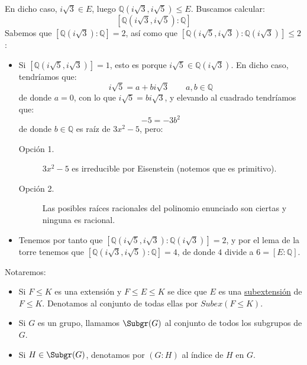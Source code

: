 \begin{ejemplo}
    \noindent
    En dicho caso, $i\sqrt{3}\in E$, luego $\mathbb{Q}\left(i\sqrt{3},i\sqrt{5}\right)\leq E$. Buscamos calcular:
    \begin{equation*}
        \left[\mathbb{Q}\left(i\sqrt{3},i\sqrt{5}\right):\mathbb{Q}\right]
    \end{equation*}
    Sabemos que $\left[\mathbb{Q}\left(i\sqrt{3}\right):\mathbb{Q}\right] = 2$, así como que $\left[\mathbb{Q}\left(i\sqrt{5},i\sqrt{3}\right):\mathbb{Q}\left(i\sqrt{3}\right)\right]\leq 2$:
    \begin{itemize}
        \item Si $\left[\mathbb{Q}\left(i\sqrt{5},i\sqrt{3}\right)\right]=1$, esto es porque $i\sqrt{5}\in \mathbb{Q}\left(i\sqrt{3}\right)$. En dicho caso, tendríamos que:
            \begin{equation*}
                i\sqrt{5} = a+bi\sqrt{3} \qquad a,b\in \mathbb{Q}
            \end{equation*}
            de donde $a=0$, con lo que $i\sqrt{5}=bi\sqrt{3}$, y elevando al cuadrado tendríamos que:
            \begin{equation*}
                -5 = -3b^2
            \end{equation*}
            de donde $b\in \mathbb{Q}$ es raíz de $3x^2-5$, pero:
            \begin{description}
                \item [Opción 1.] $3x^2-5$ es irreducible por Eisenstein (notemos que es primitivo).
                \item [Opción 2.] Las posibles raíces racionales del polinomio enunciado son ciertas y ninguna es racional.
            \end{description}
        \item Tenemos por tanto que $\left[\mathbb{Q}\left(i\sqrt{5},i\sqrt{3}\right):\mathbb{Q}\left(i\sqrt{3}\right)\right] = 2$, y por el lema de la torre tenemos que $\left[\mathbb{Q}\left(i\sqrt{3},i\sqrt{5}\right):\mathbb{Q}\right] =4$, de donde $4$ divide a $6 = [E:\mathbb{Q}]$.
    \end{itemize}
\end{ejemplo}

\begin{notacion} %
    Notaremos:
    \begin{itemize}
        \item Si $F\leq K$ es una extensión y $F\leq E \leq K$ se dice que $E$ es una \underline{subextensión} de $F\leq K$. Denotamos al conjunto de todas ellas por $Subex(F\leq K)$.
        \item Si $G$ es un grupo, llamamos $\Subgr(G)$ al conjunto de todos los subgrupos de $G$.
        \item Si $H\in \Subgr(G)$, denotamos por $(G:H)$ al índice de $H$ en $G$.
    \end{itemize}
\end{notacion}

